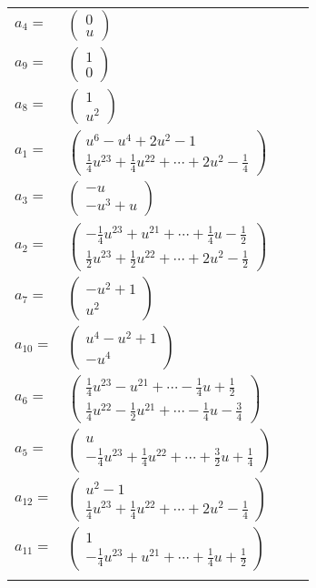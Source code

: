 \documentclass[1p]{elsarticle_modified}
\theoremstyle{definition}
\begin{document}
\begin{tabular}{m{7pt} m{180pt} m{7pt} m{180pt} }
\flushright $a_{4}=$&$\begin{pmatrix}0\\u\end{pmatrix}$ \\
\flushright $a_{9}=$&$\begin{pmatrix}1\\0\end{pmatrix}$ \\
\flushright $a_{8}=$&$\begin{pmatrix}1\\u^2\end{pmatrix}$ \\
\flushright $a_{1}=$&$\begin{pmatrix}u^6- u^4+2 u^2-1\\\frac{1}{4} u^{23}+\frac{1}{4} u^{22}+\cdots+2 u^2-\frac{1}{4}\end{pmatrix}$ \\
\flushright $a_{3}=$&$\begin{pmatrix}- u\\- u^3+u\end{pmatrix}$ \\
\flushright $a_{2}=$&$\begin{pmatrix}-\frac{1}{4} u^{23}+u^{21}+\cdots+\frac{1}{4} u-\frac{1}{2}\\\frac{1}{2} u^{23}+\frac{1}{2} u^{22}+\cdots+2 u^2-\frac{1}{2}\end{pmatrix}$ \\
\flushright $a_{7}=$&$\begin{pmatrix}- u^2+1\\u^2\end{pmatrix}$ \\
\flushright $a_{10}=$&$\begin{pmatrix}u^4- u^2+1\\- u^4\end{pmatrix}$ \\
\flushright $a_{6}=$&$\begin{pmatrix}\frac{1}{4} u^{23}- u^{21}+\cdots-\frac{1}{4} u+\frac{1}{2}\\\frac{1}{4} u^{22}-\frac{1}{2} u^{21}+\cdots-\frac{1}{4} u-\frac{3}{4}\end{pmatrix}$ \\
\flushright $a_{5}=$&$\begin{pmatrix}u\\-\frac{1}{4} u^{23}+\frac{1}{4} u^{22}+\cdots+\frac{3}{2} u+\frac{1}{4}\end{pmatrix}$ \\
\flushright $a_{12}=$&$\begin{pmatrix}u^2-1\\\frac{1}{4} u^{23}+\frac{1}{4} u^{22}+\cdots+2 u^2-\frac{1}{4}\end{pmatrix}$ \\
\flushright $a_{11}=$&$\begin{pmatrix}1\\-\frac{1}{4} u^{23}+u^{21}+\cdots+\frac{1}{4} u+\frac{1}{2}\end{pmatrix}$\\&\end{tabular}
\end{document}
